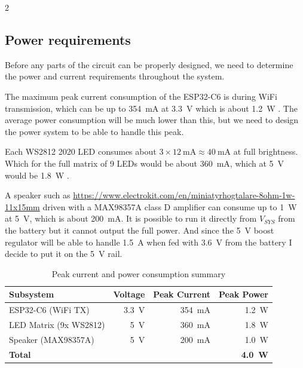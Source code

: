 \documentclass[11px]{specification}
\begin{document}
\begin{multicols}{2}

\subsection{Power requirements}

Before any parts of the circuit can be properly designed, we need to determine the power and current requirements throughout the system.

The maximum peak current consumption of the ESP32-C6 is during WiFi transmission, which can be up to \qty{354}{\milli\ampere} at \qty{3.3}{\volt} which is about \qty{1.2}{\watt} \cite[66]{esp32-c6-datasheet}. The average power consumption will be much lower than this, but we need to design the power system to be able to handle this peak.

Each WS2812 2020 LED consumes about $3 \times \qty{12}{\milli\ampere} \approx \qty{40}{\milli\ampere}$ at full brightness. Which for the full matrix of 9 LEDs would be about \qty{360}{\milli\ampere}, which at \qty{5}{\volt} would be \qty{1.8}{\watt} \cite{ws2812-product-page}.

A speaker such as \url{https://www.electrokit.com/en/miniatyrhogtalare-8ohm-1w-11x15mm} driven with a MAX98357A class D amplifier can consume up to \qty{1}{\watt} at \qty{5}{\volt}, which is about \qty{200}{\milli\ampere}. It is possible to run it directly from $V_{SYS}$ from the battery but it cannot output the full power. And since the \qty{5}{\volt} boost regulator will be able to handle \qty{1.5}{\ampere} when fed with \qty{3.6}{\volt} from the battery I decide to put it on the \qty{5}{\volt} rail.

\end{multicols}

\begin{table}[H]
    \centering
    \begin{tabular}{|l|r|r|r|}
        \hline
        \textbf{Subsystem}     & \textbf{Voltage} & \textbf{Peak Current}    & \textbf{Peak Power}       \\
        \hline
        ESP32-C6 (WiFi TX)     & \qty{3.3}{\volt} & \qty{354}{\milli\ampere} & \qty{1.2}{\watt}          \\
        LED Matrix (9x WS2812) & \qty{5}{\volt}   & \qty{360}{\milli\ampere} & \qty{1.8}{\watt}          \\
        Speaker (MAX98357A)    & \qty{5}{\volt}   & \qty{200}{\milli\ampere} & \qty{1.0}{\watt}          \\
        \hline
        \textbf{Total}         &                  &                          & \textbf{\qty{4.0}{\watt}} \\
        \hline
    \end{tabular}
    \caption{Peak current and power consumption summary}
    \label{tab:power-summary}
\end{table}
\end{document}
